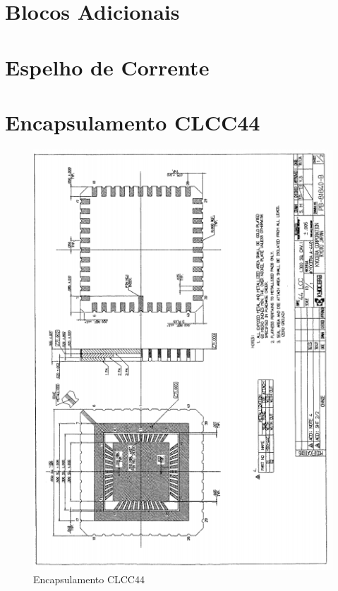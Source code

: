 \chapter{Blocos Adicionais}
\label{blocosadicionais}



\chapter{Espelho de Corrente}


\chapter{Encapsulamento CLCC44}
\label{anexo_clcc44}
\begin{figure}[htbp]
 \centering
    \caption{Encapsulamento CLCC44} 
    \includegraphics[scale=0.9]{Anexos/CLC44.png}
\end{figure}